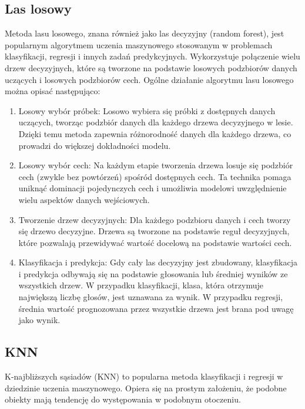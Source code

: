 \documentclass{article}
\begin{document}
\subsection{Las losowy}
Metoda lasu losowego, znana również jako las decyzyjny (random forest), jest popularnym algorytmem uczenia maszynowego stosowanym w problemach klasyfikacji, regresji i innych zadań predykcyjnych. Wykorzystuje połączenie wielu drzew decyzyjnych, które są tworzone na podstawie losowych podzbiorów danych uczących i losowych podzbiorów cech. \newline
Ogólne działanie algorytmu lasu losowego można opisać następująco:
\begin{enumerate}
    \item Losowy wybór próbek: Losowo wybiera się próbki z dostępnych danych uczących, tworząc podzbiór danych dla każdego drzewa decyzyjnego w lesie. Dzięki temu metoda zapewnia różnorodność danych dla każdego drzewa, co prowadzi do większej dokładności modelu.

    \item Losowy wybór cech: Na każdym etapie tworzenia drzewa losuje się podzbiór cech (zwykle bez powtórzeń) spośród dostępnych cech. Ta technika pomaga uniknąć dominacji pojedynczych cech i umożliwia modelowi uwzględnienie wielu aspektów danych wejściowych.

    \item Tworzenie drzew decyzyjnych: Dla każdego podzbioru danych i cech tworzy się drzewo decyzyjne. Drzewa są tworzone na podstawie reguł decyzyjnych, które pozwalają przewidywać wartość docelową na podstawie wartości cech.

    \item Klasyfikacja i predykcja: Gdy cały las decyzyjny jest zbudowany, klasyfikacja i predykcja odbywają się na podstawie głosowania lub średniej wyników ze wszystkich drzew. W przypadku klasyfikacji, klasa, która otrzymuje największą liczbę głosów, jest uznawana za wynik. W przypadku regresji, średnia wartość prognozowana przez wszystkie drzewa jest brana pod uwagę jako wynik.
\end{enumerate}
\subsection{KNN}
K-najbliższych sąsiadów (KNN) to popularna metoda klasyfikacji i regresji w dziedzinie uczenia maszynowego. Opiera się na prostym założeniu, że podobne obiekty mają tendencję do występowania w podobnym otoczeniu.
\end{document}
